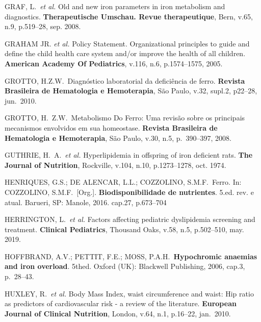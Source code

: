 \bigbreak

\noindent GRAF, L.\ \textit{et al.} Old and new iron parameters in iron metabolism and diagnostics. \textbf{Therapeutische Umschau. Revue therapeutique}, Bern, v.65, n.9, p.519--28, sep. 2008.

\bigbreak

\noindent GRAHAM JR. \textit{et al.} Policy Statement. Organizational principles to guide and define the child health care system and/or improve the health of all children. \textbf{American Academy Of Pediatrics}, v.116, n.6, p.1574--1575, 2005. 

\bigbreak

\noindent GROTTO, H.Z.W.\ Diagnóstico laboratorial da deficiência de ferro. \textbf{Revista Brasileira de Hematologia e Hemoterapia}, São Paulo, v.32, supl.2, p22--28, jun.\ 2010.

\bigbreak

\noindent GROTTO, H.\ Z.W.\ Metabolismo Do Ferro: Uma revisão sobre os principais mecanismos envolvidos em sua homeostase. \textbf{Revista Brasileira de Hematologia e Hemoterapia}, São Paulo, v.30, n.5, p.\ 390--397, 2008.

\bigbreak

\noindent GUTHRIE, H.\ A.\ \textit{et al.} Hyperlipidemia in offspring of iron deficient rats. \textbf{The Journal of Nutrition}, Rockville, v.104, n.10, p.1273–1278, oct. 1974.

\bigbreak

\noindent HENRIQUES, G.S.; DE ALENCAR, L.L.; COZZOLINO, S.M.F.\ Ferro. In: COZZOLINO, S.M.F.\ [Org.]. \textbf{Biodisponibilidade de nutrientes}. 5.ed. rev. e atual. Barueri, SP: Manole, 2016. cap.27, p.673--704

\bigbreak

\noindent HERRINGTON, L.\ \textit{et al.} Factors affecting pediatric dyslipidemia screening and treatment. \textbf{Clinical Pediatrics}, Thousand Oaks, v.58, n.5, p.502--510, may. 2019.

\bigbreak

\noindent HOFFBRAND, A.V.; PETTIT, F.E.; MOSS, P.A.H.\ \textbf{Hypochromic anaemias and iron overload}. 5thed. Oxford (UK): Blackwell Publishing, 2006, cap.3, p.\ 28--43. 

\bigbreak

\noindent HUXLEY, R.\ \textit{et al.} Body Mass Index, waist circumference and waist: Hip ratio as predictors of cardiovascular risk - a review of the literature. \textbf{European Journal of Clinical Nutrition}, London, v.64, n.1, p.16--22, jan.\ 2010.

